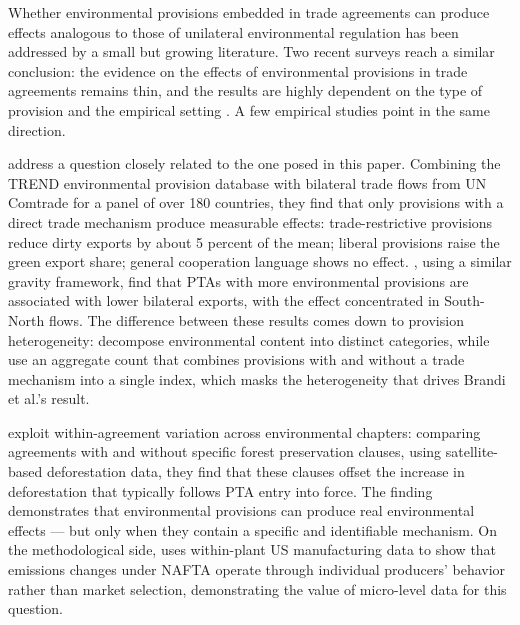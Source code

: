 \documentclass[12pt]{article}
\begin{document}
Whether environmental provisions embedded in trade agreements can produce effects analogous to those of unilateral environmental regulation has been addressed by a small but growing literature. Two recent surveys reach a similar conclusion: the evidence on the effects of environmental provisions in trade agreements remains thin, and the results are highly dependent on the type of provision and the empirical setting \citep{gutsch2025, felbermayr2025}. A few empirical studies point in the same direction.

\citet{brandi2020} address a question closely related to the one posed in this paper. Combining the TREND environmental provision database \citep{morin2017} with bilateral trade flows from UN Comtrade for a panel of over 180 countries, they find that only provisions with a direct trade mechanism produce measurable effects: trade-restrictive provisions reduce dirty exports by about 5 percent of the mean; liberal provisions raise the green export share; general cooperation language shows no effect. \citet{berger2020}, using a similar gravity framework, find that PTAs with more environmental provisions are associated with lower bilateral exports, with the effect concentrated in South-North flows. The difference between these results comes down to provision heterogeneity: \citet{brandi2020} decompose environmental content into distinct categories, while \citet{berger2020} use an aggregate count that combines provisions with and without a trade mechanism into a single index, which masks the heterogeneity that drives Brandi et al.'s result.

\citet{abman2024} exploit within-agreement variation across environmental chapters: comparing agreements with and without specific forest preservation clauses, using satellite-based deforestation data, they find that these clauses offset the increase in deforestation that typically follows PTA entry into force. The finding demonstrates that environmental provisions can produce real environmental effects --- but only when they contain a specific and identifiable mechanism. On the methodological side, \citet{cherniwchan2017} uses within-plant US manufacturing data to show that emissions changes under NAFTA operate through individual producers' behavior rather than market selection, demonstrating the value of micro-level data for this question.
\end{document}
